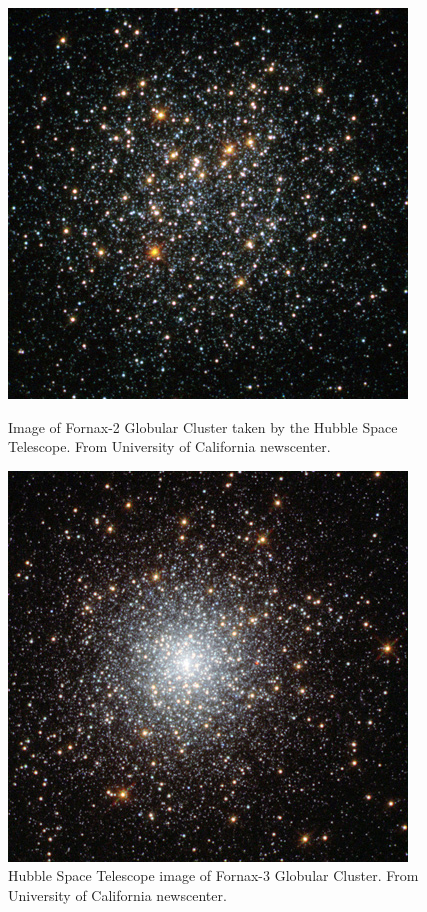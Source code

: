 \begin{figure}[H]
  \centering
  \begin{minipage}[b]{0.49\textwidth}
    \includegraphics[width=\textwidth]{images/fornax-2-400.jpg}
    \caption[Hubble image of Fornax-2 Globular Cluster]{Image of Fornax-2 Globular Cluster taken by the Hubble Space Telescope. From University of California newscenter.}
  \end{minipage}
  \hfill
  \begin{minipage}[b]{0.49\textwidth}
    \includegraphics[width=\textwidth]{images/fornax-3-400.jpg}
    \caption[Hubble Space Telescope image of Fornax-3 Globular Cluster]{Hubble Space Telescope image of Fornax-3 Globular Cluster. From University of California newscenter.}
  \end{minipage}
\end{figure}


